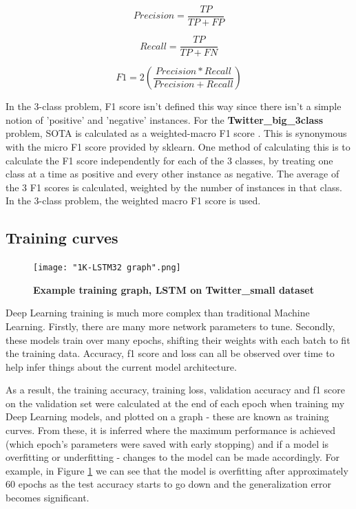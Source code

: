 \documentclass[12pt,a4paper]{article}
\begin{document}
\begin{multicols}{2}
	\begin{equation}
	{Precision = \frac{TP}{TP+FP} }
	\end{equation}
	
	\begin{equation}
	{Recall = \frac{TP}{TP+FN} }
	\end{equation}
	
	\begin{equation}
	{F1 = 2 ( \frac{Precision*Recall}{Precision+Recall} )}
	\end{equation}
\end{multicols}

In the 3-class problem, F1 score isn't defined this way since there isn't a simple notion of 'positive' and 'negative' instances. For the \textbf{Twitter\_big\_3class} problem, SOTA is calculated as a weighted-macro F1 score \cite{Badjatiya}. This is synonymous with the micro F1 score provided by sklearn. One method of calculating this is to calculate the F1 score independently for each of the 3 classes, by treating one class at a time as positive and every other instance as negative. The average of the 3 F1 scores is calculated, weighted by the number of instances in that class. In the 3-class problem, the weighted macro F1 score is used.

\subsection{Training curves}
\begin{figure}
	\centering
	\vspace*{-20pt}
	\texttt{[image: "1K-LSTM32 graph".png]}
	\caption{\textbf{Example training graph, LSTM on \textbf{Twitter\_small} dataset}}
	\label{training}
\end{figure}
Deep Learning training is much more complex than traditional Machine Learning. Firstly, there are many more network parameters to tune. Secondly, these models train over many epochs, shifting their weights with each batch to fit the training data. Accuracy, f1 score and loss can all be observed over time to help infer things about the current model architecture.

As a result, the training accuracy, training loss, validation accuracy  and f1 score on the validation set were calculated at the end of each epoch when training my Deep Learning models, and plotted on a graph - these are known as training curves. From these, it is inferred where the maximum performance is achieved (which epoch's parameters were saved with early stopping) and if a model is overfitting or underfitting - changes to the model can be made accordingly. For example, in Figure \ref{training} we can see that the model is overfitting after approximately 60 epochs as the test accuracy starts to go down and the generalization error becomes significant.
\end{document}
